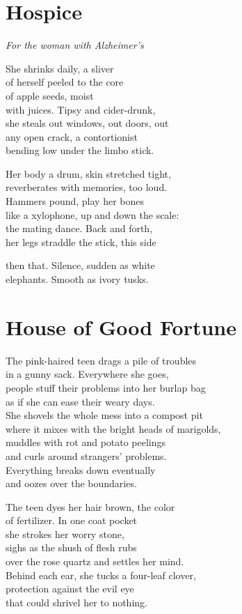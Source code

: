 \documentclass[twoside,10pt]{book}
\begin{document}
\clearpage
\section{Hospice}

\emph{For the woman with Alzheimer's}

She shrinks daily, a sliver\\
of herself peeled to the core\\
of apple seeds, moist\\
with juices. Tipsy and cider-drunk,\\
she steals out windows, out doors, out\\
any open crack, a contortionist\\
bending low under the limbo stick.

Her body a drum, skin stretched tight,\\
reverberates with memories, too loud.\\
Hammers pound, play her bones\\
like a xylophone, up and down the scale:\\
the mating dance. Back and forth,\\
her legs straddle the stick, this side

then that. Silence, sudden as white\\
elephants. Smooth as ivory tusks.


\clearpage
\section{House of Good Fortune}

The pink-haired teen drags a pile of troubles\\
in a gunny sack. Everywhere she goes,\\
people stuff their problems into her burlap bag\\
as if she can ease their weary days.\\
She shovels the whole mess into a compost pit\\
where it mixes with the bright heads of marigolds,\\
muddles with rot and potato peelings\\
and curls around strangers' problems.\\
Everything breaks down eventually\\
and oozes over the boundaries.

The teen dyes her hair brown, the color\\
of fertilizer. In one coat pocket\\
she strokes her worry stone,\\
sighs as the shush of flesh rubs\\
over the rose quartz and settles her mind.\\
Behind each ear, she tucks a four-leaf clover,\\
protection against the evil eye\\
that could shrivel her to nothing.
\end{document}
